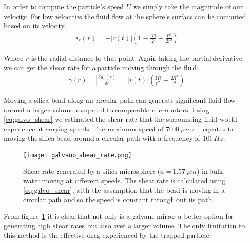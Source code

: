 \documentclass[a4paper,oneside,11pt]{book}
\begin{document}
In order to compute the particle's speed $U$ we simply take the 
magnitude of our velocity. For low velocities the fluid flow at 
the sphere's surface can be computed based on its velocity.
\begin{align}
	u_r(r)=-|v(t)|\left(1-\frac{3R}{2r}+\frac{R^3}{2r^3}\right)
\end{align}

Where $r$ is the radial distance to that point. Again taking the partial 
derivative we can get the shear rate for a particle moving through the fluid:
\begin{align}
	\dot{\gamma}(r) = \left| \frac{\delta u_r(r)}{\delta r}\right| = |v(t)|\left(\frac{3R}{r^2} -\frac{2R^3}{r^4} \right)
	\label{eq:galvo_shear}
\end{align}

Moving a silica bead along an circular path can generate significant fluid 
flow around a larger volume compared to comparable micro-rotors. Using 
\eqref{eq:galvo_shear} we estimated the shear rate that the surrounding fluid 
would experience at varying speeds. The maximum speed of $7000\ \mu m s^{-1}$
equates to moving the silica bead around a circular path with a frequency of 
$100\ Hz$.
\begin{figure}[h!]
	\centering
	\texttt{[image: galvano\_shear\_rate.png]}
	\caption{Shear rate generated by a silica microsphere ($a = 1.57\ \mu m$) 
		in bulk water moving at different speeds. The shear rate is calculated 
		using \eqref{eq:galvo_shear}, with the assumption that the bead is moving
		in a circular path and so the speed is constant through out its path.}
	\label{fig:galvano_shear}
\end{figure}

From figure~\ref{fig:galvano_shear} it is clear that not only is a galvano 
mirror a better option for generating high shear rates but also over a larger 
volume. The only limitation to this method is the effective drag experienced 
by the trapped particle. 
\printbibliography
\end{document}
